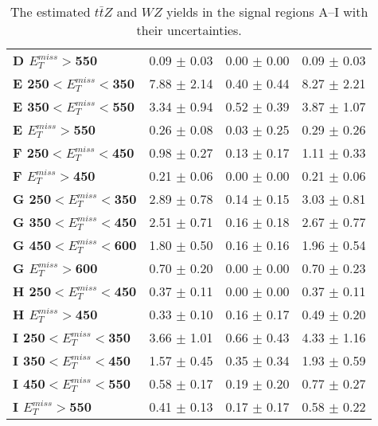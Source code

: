 \begin{table}[h]
{\begin{tabular}{|l|ccc|}
\textbf{ D $E_T^{miss}>$550}     & 0.09 $\pm$ 0.03       & 0.00 $\pm$ 0.00       & 0.09 $\pm$ 0.03       \\
\textbf{ E 250$<E_T^{miss}<$350}         & 7.88 $\pm$ 2.14       & 0.40 $\pm$ 0.44       & 8.27 $\pm$ 2.21       \\
\textbf{ E 350$<E_T^{miss}<$550}         & 3.34 $\pm$ 0.94       & 0.52 $\pm$ 0.39       & 3.87 $\pm$ 1.07       \\
\textbf{ E $E_T^{miss}>$550}     & 0.26 $\pm$ 0.08       & 0.03 $\pm$ 0.25       & 0.29 $\pm$ 0.26       \\
\textbf{ F 250$<E_T^{miss}<$450}         & 0.98 $\pm$ 0.27       & 0.13 $\pm$ 0.17       & 1.11 $\pm$ 0.33       \\
\textbf{ F $E_T^{miss}>$450}     & 0.21 $\pm$ 0.06       & 0.00 $\pm$ 0.00       & 0.21 $\pm$ 0.06       \\
\textbf{ G 250$<E_T^{miss}<$350}         & 2.89 $\pm$ 0.78       & 0.14 $\pm$ 0.15       & 3.03 $\pm$ 0.81       \\
\textbf{ G 350$<E_T^{miss}<$450}         & 2.51 $\pm$ 0.71       & 0.16 $\pm$ 0.18       & 2.67 $\pm$ 0.77       \\
\textbf{ G 450$<E_T^{miss}<$600}         & 1.80 $\pm$ 0.50       & 0.16 $\pm$ 0.16       & 1.96 $\pm$ 0.54       \\
\textbf{ G $E_T^{miss}>$600}     & 0.70 $\pm$ 0.20       & 0.00 $\pm$ 0.00       & 0.70 $\pm$ 0.23       \\
\textbf{ H 250$<E_T^{miss}<$450}         & 0.37 $\pm$ 0.11       & 0.00 $\pm$ 0.00       & 0.37 $\pm$ 0.11       \\
\textbf{ H $E_T^{miss}>$450}     & 0.33 $\pm$ 0.10       & 0.16 $\pm$ 0.17       & 0.49 $\pm$ 0.20       \\
\hline
\textbf{ I 250$<E_T^{miss}<$350}         & 3.66 $\pm$ 1.01       & 0.66 $\pm$ 0.43       & 4.33 $\pm$ 1.16       \\
\textbf{ I 350$<E_T^{miss}<$450}         & 1.57 $\pm$ 0.45       & 0.35 $\pm$ 0.34       & 1.93 $\pm$ 0.59       \\
\textbf{ I 450$<E_T^{miss}<$550}         & 0.58 $\pm$ 0.17       & 0.19 $\pm$ 0.20       & 0.77 $\pm$ 0.27       \\
\textbf{ I $E_T^{miss}>$550}     & 0.41 $\pm$ 0.13       & 0.17 $\pm$ 0.17       & 0.58 $\pm$ 0.22       \\
\hline
\end{tabular}}
\caption[Table caption text]{The estimated $t\bar{t}Z$ and $WZ$ yields in the signal regions A--I with their uncertainties. }
\label{tab:YZnunu}
\end{table}


